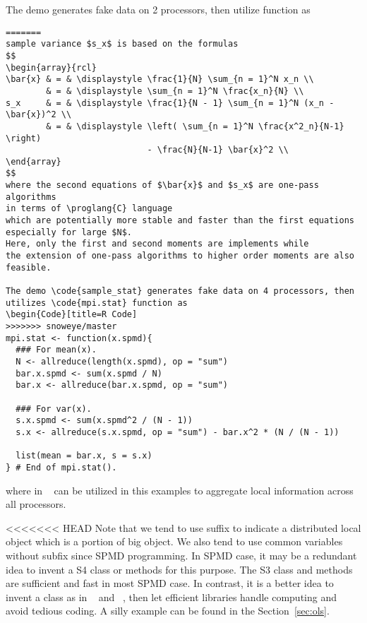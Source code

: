 The demo  generates fake data on 2 processors, then
utilize  function as
\begin{lstlisting}[language=rr,title=R Code]
=======
sample variance $s_x$ is based on the formulas
$$
\begin{array}{rcl}
\bar{x} & = & \displaystyle \frac{1}{N} \sum_{n = 1}^N x_n \\
        & = & \displaystyle \sum_{n = 1}^N \frac{x_n}{N} \\
s_x     & = & \displaystyle \frac{1}{N - 1} \sum_{n = 1}^N (x_n - \bar{x})^2 \\
        & = & \displaystyle \left( \sum_{n = 1}^N \frac{x^2_n}{N-1} \right)
                            - \frac{N}{N-1} \bar{x}^2 \\
\end{array}
$$
where the second equations of $\bar{x}$ and $s_x$ are one-pass algorithms
in terms of \proglang{C} language
which are potentially more stable and faster than the first equations
especially for large $N$.
Here, only the first and second moments are implements while
the extension of one-pass algorithms to higher order moments are also
feasible.

The demo \code{sample_stat} generates fake data on 4 processors, then
utilizes \code{mpi.stat} function as
\begin{Code}[title=R Code]
>>>>>>> snoweye/master
mpi.stat <- function(x.spmd){
  ### For mean(x).
  N <- allreduce(length(x.spmd), op = "sum")
  bar.x.spmd <- sum(x.spmd / N)
  bar.x <- allreduce(bar.x.spmd, op = "sum")

  ### For var(x).
  s.x.spmd <- sum(x.spmd^2 / (N - 1))
  s.x <- allreduce(s.x.spmd, op = "sum") - bar.x^2 * (N / (N - 1))

  list(mean = bar.x, s = s.x)
} # End of mpi.stat().
\end{lstlisting}
where  in ~\citep{Chen2012pbdMPIpackage} can
be utilized in this examples to aggregate local information across
all processors.

<<<<<<< HEAD
Note that we tend to use suffix  to indicate a distributed
local object which is a portion of big object.
We also tend to use common variables without subfix 
since SPMD programming.
In SPMD case, it may be a redundant idea to invent a  S4 class
or methods for this purpose. The S3 class and methods are sufficient
and fast in most SPMD case.
In contrast, it is a better idea to invent a  class as in
~\citep{Schmidt2012pbdBASEpackage} and
~\citep{Schmidt2012pbdDMATpackage}, then let efficient libraries
handle computing and avoid tedious coding.
A silly example can be found in the Section~\ref{sec:ols}.


